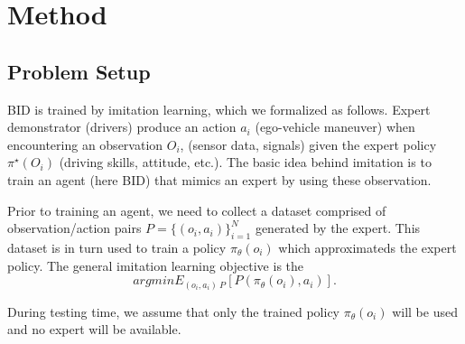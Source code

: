 \section{Method}

\subsection{Problem Setup}

BID is trained by imitation learning, which we formalized as follows.
Expert demonstrator (drivers) produce an action $a_i$ (ego-vehicle maneuver) when encountering an observation $O_i$, (sensor data, signals) given the expert policy $\pi^{ \star } (O_i)$ (driving skills, attitude, etc.).
The basic idea behind imitation is to train an agent (here BID) that mimics an expert by using these observation.


Prior to training an agent, we need to collect a dataset comprised of observation/action pairs $P= \{ (o_i, a_i) \}_{i=1} ^N $ generated by the expert.
This dataset is in turn used to train a policy $\pi_\theta (o_i)$ which approximateds the expert policy.
The general imitation learning objective is the 
\begin{equation}
	argmin E_{(o_i, a_i) ~ P} [P(\pi_\theta (o_i), a_i )].
\end{equation}

During testing time, we assume that only the trained policy $ \pi_\theta (o_i) $ will be used and no expert will be available.

